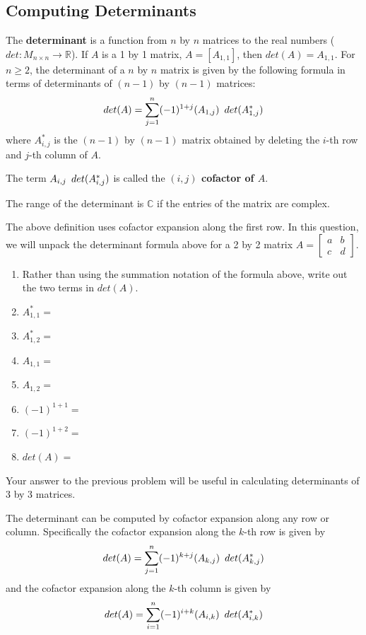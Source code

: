 \subsection{Computing Determinants}
\begin{definition}
The \textbf{determinant} is a function from $n$ by $n$ matrices to the real numbers ($det:M_{n \times n} \rightarrow \mathbb{R}$). If $A$ is a 1 by 1 matrix, $A=[A_{1,1}]$, then $det(A)=A_{1,1}$. For $n \geq 2$, the determinant of a $n$ by $n$ matrix is given by the following formula in terms of determinants of $(n-1)$ by $(n-1)$ matrices:
$$det(A)=\sum_{j=1}^n (-1)^{1+j} (A_{1,j}) \enskip det(A^*_{1,j})$$
where $A^*_{i,j}$ is the $(n-1)$ by $(n-1)$ matrix obtained by deleting the $i$-th row and $j$-th column of $A$.

The term $A_{i,j}\enskip det(A^*_{i,j})$ is called the \textbf{$(i,j)$ cofactor of $A$}.

The range of the determinant is $\mathbb{C}$ if the entries of the matrix are complex.
\end{definition}
The above definition uses cofactor expansion along the first row.
\bq In this question, we will unpack the determinant formula above for a 2 by 2 matrix $A=\begin{bmatrix} a&b \\c&d \end{bmatrix}$.
\begin{enumerate}
\item Rather than using the summation notation of the formula above, write out the two terms in $det(A)$.
\item $A^*_{1,1}=$
\item $A^*_{1,2}=$
\item $A_{1,1}=$
\item $A_{1,2}=$
\item $(-1)^{1+1}=$
\item $(-1)^{1+2}=$
\item $det(A)=$
\end{enumerate}
\eq
Your answer to the previous problem will be useful in calculating determinants of 3 by 3 matrices.
\begin{theorem}
The determinant can be computed by cofactor expansion along any row or column. Specifically the cofactor expansion along the $k$-th row is given by $$det(A)=\sum_{j=1}^n (-1)^{k+j} (A_{k,j}) \enskip det(A^*_{k,j})$$
and the cofactor expansion along the $k$-th column is given by
$$det(A)=\sum_{i=1}^n (-1)^{i+k} (A_{i,k}) \enskip det(A^*_{i,k})$$
\end{theorem}

